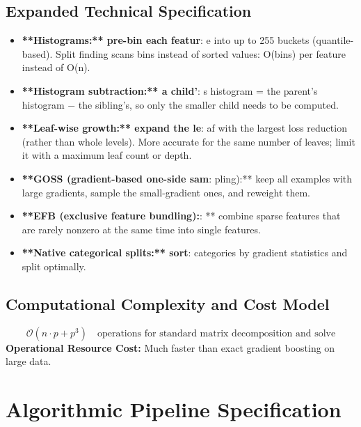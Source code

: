 \documentclass[11pt,a4paper]{article}
\theoremstyle{definition}
\begin{document}
\subsection{Expanded Technical Specification}
\begin{itemize}
\item \textbf{**Histograms:** pre-bin each featur}: e into up to 255 buckets (quantile-based). Split finding scans bins instead of sorted values: O(bins) per feature instead of O(n).
\item \textbf{**Histogram subtraction:** a child'}: s histogram = the parent's histogram − the sibling's, so only the smaller child needs to be computed.
\item \textbf{**Leaf-wise growth:** expand the le}: af with the largest loss reduction (rather than whole levels). More accurate for the same number of leaves; limit it with a maximum leaf count or depth.
\item \textbf{**GOSS (gradient-based one-side sam}: pling):** keep all examples with large gradients, sample the small-gradient ones, and reweight them.
\item \textbf{**EFB (exclusive feature bundling):}: ** combine sparse features that are rarely nonzero at the same time into single features.
\item \textbf{**Native categorical splits:** sort}:  categories by gradient statistics and split optimally.
\end{itemize}

\subsection{Computational Complexity and Cost Model}
\begin{equation}
\mathcal{O}(n \cdot p + p^3) \quad \text{operations for standard matrix decomposition and solve}
\end{equation}
\textbf{Operational Resource Cost:} Much faster than exact gradient boosting on large data.

\section{Algorithmic Pipeline Specification}
\end{document}
